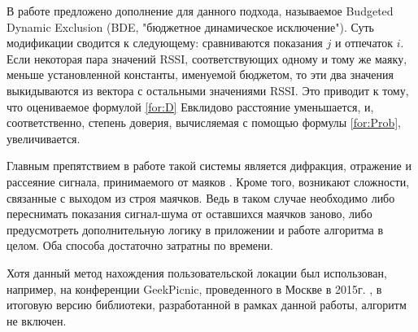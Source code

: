 В работе \cite{elbes2013precise} предложено дополнение для данного подхода, называемое Budgeted Dynamic Exclusion (BDE, "бюджетное динамическое исключение"). Суть модификации сводится к следующему: сравниваются показания $j$ и отпечаток $i$. Если некоторая пара значений RSSI, соответствующих одному и тому же маяку, меньше установленной константы, именуемой бюджетом, то эти два значения выкидываются из вектора с остальными значениями RSSI. Это приводит к тому, что оцениваемое формулой \ref{for:D} Евклидово расстояние уменьшается, и, соответственно, степень доверия, вычисляемая с помощью формулы \ref{for:Prob}, увеличивается.

Главным препятствием в работе такой системы является дифракция, отражение и рассеяние сигнала, принимаемого от маяков \cite{liu2007survey}. Кроме того, возникают сложности, связанные с выходом из строя маячков. Ведь в таком случае необходимо либо переснимать показания сигнал-шума от оставшихся маячков заново, либо предусмотреть дополнительную логику в приложении и работе алгоритма в целом. Оба способа достаточно затратны по времени.

Хотя данный метод нахождения пользовательской локации был использован, например, на конференции GeekPicnic, проведенного в Москве в 2015г. \cite{web:habrGeekPicknic}, в итоговую версию библиотеки, разработанной в рамках данной работы, алгоритм не включен.